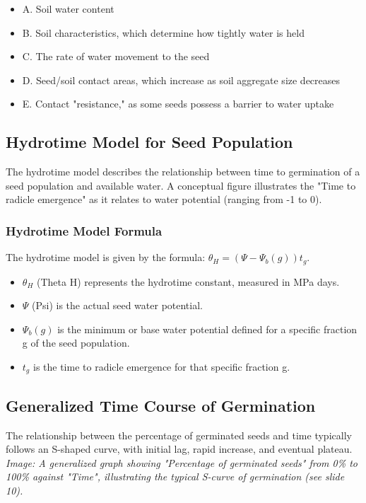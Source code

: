 \begin{itemize} 
    \item A. Soil water content 
    \item B. Soil characteristics, which determine how tightly water is held 
    \item C. The rate of water movement to the seed 
    \item D. Seed/soil contact areas, which increase as soil aggregate size decreases 
    \item E. Contact "resistance," as some seeds possess a barrier to water uptake 
\end{itemize}

\subsection{Hydrotime Model for Seed Population} 
The hydrotime model describes the relationship between time to germination of a seed population and available water. A conceptual figure illustrates the "Time to radicle emergence" as it relates to water potential (ranging from -1 to 0).

\subsubsection*{Hydrotime Model Formula} 
The hydrotime model is given by the formula: $\theta_H = (\Psi - \Psi_b(g))t_g$. 

\begin{itemize} 
    \item $\theta_H$ (Theta H) represents the hydrotime constant, measured in MPa days. 
    \item $\Psi$ (Psi) is the actual seed water potential. 
    \item $\Psi_b(g)$ is the minimum or base water potential defined for a specific fraction g of the seed population. 
    \item $t_g$ is the time to radicle emergence for that specific fraction g. 
\end{itemize}

\subsection{Generalized Time Course of Germination} 
The relationship between the percentage of germinated seeds and time typically follows an S-shaped curve, with initial lag, rapid increase, and eventual plateau. \textit{Image: A generalized graph showing "Percentage of germinated seeds" from 0\% to 100\% against "Time", illustrating the typical S-curve of germination (see slide 10).}

